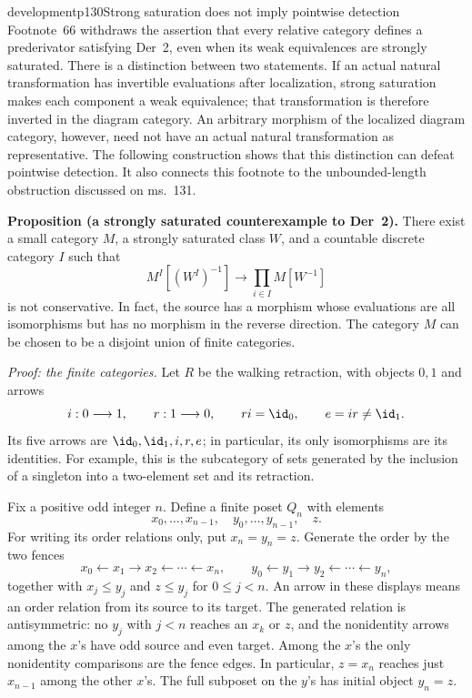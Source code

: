 \begin{dcomment}{development}{p130}{Strong saturation does not imply pointwise detection}
Footnote~66 withdraws the assertion that every relative category defines a prederivator satisfying Der~2, even when its weak equivalences are strongly saturated. There is a distinction between two statements. If an actual natural transformation has invertible evaluations after localization, strong saturation makes each component a weak equivalence; that transformation is therefore inverted in the diagram category. An arbitrary morphism of the localized diagram category, however, need not have an actual natural transformation as representative. The following construction shows that this distinction can defeat pointwise detection. It also connects this footnote to the unbounded-length obstruction discussed on ms.~131.

\textbf{Proposition (a strongly saturated counterexample to Der~2).}\ours
There exist a small category $M$, a strongly saturated class $W$, and a countable discrete category $I$ such that
\[
 M^I[(W^I)^{-1}]\longrightarrow\prod_{i\in I}M[W^{-1}]
\]
is not conservative. In fact, the source has a morphism whose evaluations are all isomorphisms but has no morphism in the reverse direction. The category $M$ can be chosen to be a disjoint union of finite categories.

\textit{Proof: the finite categories.}
Let $R$ be the walking retraction, with objects $0,1$ and arrows
\[
 i:0\longrightarrow1,\qquad r:1\longrightarrow0,\qquad
 ri=\id_0,\qquad e=ir\ne\id_1.
\]
Its five arrows are $\id_0,\id_1,i,r,e$; in particular, its only isomorphisms are its identities. For example, this is the subcategory of sets generated by the inclusion of a singleton into a two-element set and its retraction.

Fix a positive odd integer $n$. Define a finite poset $Q_n$ with elements
\[
 x_0,\ldots,x_{n-1},\quad y_0,\ldots,y_{n-1},\quad z.
\]
For writing its order relations only, put $x_n=y_n=z$. Generate the order by the two fences
\[
 x_0\longleftarrow x_1\longrightarrow x_2\longleftarrow\cdots
 \longleftarrow x_n,
 \qquad
 y_0\longleftarrow y_1\longrightarrow y_2\longleftarrow\cdots
 \longleftarrow y_n,
\]
together with $x_j\leq y_j$ and $z\leq y_j$ for $0\leq j<n$. An arrow in these displays means an order relation from its source to its target. The generated relation is antisymmetric: no $y_j$ with $j<n$ reaches an $x_k$ or $z$, and the nonidentity arrows among the $x$'s have odd source and even target. Among the $x$'s the only nonidentity comparisons are the fence edges. In particular, $z=x_n$ reaches just $x_{n-1}$ among the other $x$'s. The full subposet on the $y$'s has initial object $y_n=z$.


\end{dcomment}
